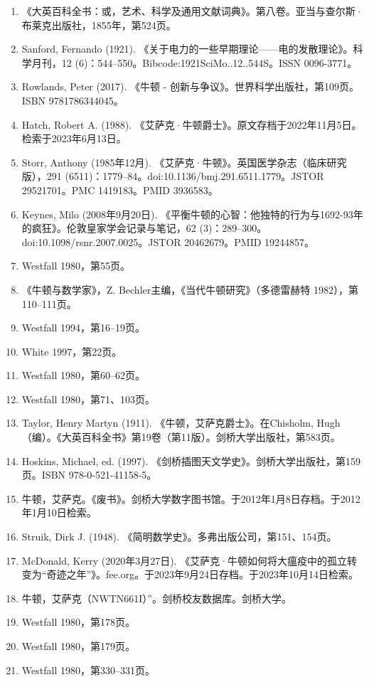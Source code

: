 \begin{enumerate}
\item 《大英百科全书：或，艺术、科学及通用文献词典》。第八卷。亚当与查尔斯·布莱克出版社，1855年，第524页。  
\item Sanford, Fernando (1921). 《关于电力的一些早期理论——电的发散理论》。科学月刊，12 (6)：544–550。Bibcode:1921SciMo..12..544S。ISSN 0096-3771。  
\item Rowlands, Peter (2017). 《牛顿 - 创新与争议》。世界科学出版社，第109页。ISBN 9781786344045。
\item Hatch, Robert A. (1988). 《艾萨克·牛顿爵士》。原文存档于2022年11月5日。检索于2023年6月13日。  
\item Storr, Anthony (1985年12月). 《艾萨克·牛顿》。英国医学杂志（临床研究版），291 (6511)：1779–84。doi:10.1136/bmj.291.6511.1779。JSTOR 29521701。PMC 1419183。PMID 3936583。  
\item Keynes, Milo (2008年9月20日). 《平衡牛顿的心智：他独特的行为与1692-93年的疯狂》。伦敦皇家学会记录与笔记，62 (3)：289–300。doi:10.1098/rsnr.2007.0025。JSTOR 20462679。PMID 19244857。  
\item Westfall 1980，第55页。
\item 《牛顿与数学家》，Z. Bechler主编，《当代牛顿研究》（多德雷赫特 1982），第110–111页。  
\item Westfall 1994，第16–19页。  
\item White 1997，第22页。  
\item Westfall 1980，第60–62页。  
\item Westfall 1980，第71、103页。
\item Taylor, Henry Martyn (1911). 《牛顿，艾萨克爵士》。在Chisholm, Hugh（编）。《大英百科全书》第19卷（第11版）。剑桥大学出版社，第583页。  
\item Hoskins, Michael, ed. (1997). 《剑桥插图天文学史》。剑桥大学出版社，第159页。ISBN 978-0-521-41158-5。  
\item 牛顿，艾萨克。《废书》。剑桥大学数字图书馆。于2012年1月8日存档。于2012年1月10日检索。
\item Struik, Dirk J. (1948). 《简明数学史》。多弗出版公司，第151、154页。  
\item McDonald, Kerry (2020年3月27日). 《艾萨克·牛顿如何将大瘟疫中的孤立转变为“奇迹之年”》。fee.org。于2023年9月24日存档。于2023年10月14日检索。  
\item 牛顿，艾萨克（NWTN661I）”。剑桥校友数据库。剑桥大学。
\item Westfall 1980，第178页。  
\item Westfall 1980，第179页。  
\item Westfall 1980，第330–331页。  

\end{enumerate}
